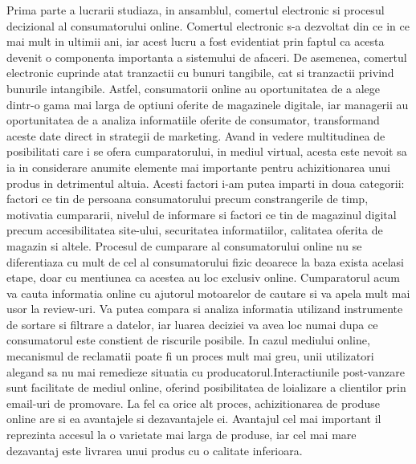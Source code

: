 \documentclass[a4paper, 12pt]{article}
\begin{document}
	\quad Prima parte a lucrarii studiaza, in ansamblul, comertul electronic si procesul decizional al consumatorului online. Comertul electronic s-a dezvoltat din ce in ce mai mult in ultimii ani, iar acest lucru a fost evidentiat prin faptul ca acesta devenit o componenta importanta a sistemului de afaceri. De asemenea, comertul electronic cuprinde atat tranzactii cu bunuri tangibile, cat si tranzactii privind bunurile intangibile. Astfel, consumatorii online au oportunitatea de a alege dintr-o gama mai larga de optiuni oferite de magazinele digitale, iar managerii au oportunitatea de a analiza informatiile oferite de consumator, transformand aceste date direct in strategii de marketing. Avand in vedere multitudinea de posibilitati care i se ofera cumparatorului, in mediul virtual, acesta este nevoit sa ia in considerare anumite elemente mai importante pentru achizitionarea unui produs in detrimentul altuia. Acesti factori i-am putea imparti in doua categorii: factori ce tin de persoana consumatorului precum constrangerile de timp, motivatia cumpararii, nivelul de informare si factori ce tin de magazinul digital precum accesibilitatea site-ului, securitatea informatiilor, calitatea oferita de magazin si altele. Procesul de cumparare al consumatorului online nu se diferentiaza cu mult de cel al consumatorului fizic deoarece la baza exista acelasi etape, doar cu mentiunea ca acestea au loc exclusiv online. Cumparatorul acum va cauta informatia online cu ajutorul motoarelor de cautare si va apela mult mai usor la review-uri. Va putea compara si analiza informatia utilizand instrumente de sortare si filtrare a datelor, iar luarea deciziei va avea loc numai dupa ce consumatorul este constient de riscurile posibile. In cazul mediului online, mecanismul de reclamatii poate fi un proces mult mai greu, unii utilizatori alegand sa nu mai remedieze situatia cu producatorul.Interactiunile post-vanzare sunt facilitate de mediul online, oferind posibilitatea de loializare a clientilor prin email-uri de promovare. La fel ca orice alt proces, achizitionarea de produse online are si ea avantajele si dezavantajele ei. Avantajul cel mai important il reprezinta accesul la o varietate mai larga de produse, iar cel mai mare dezavantaj este livrarea unui produs cu o calitate inferioara.
	
\end{document}
